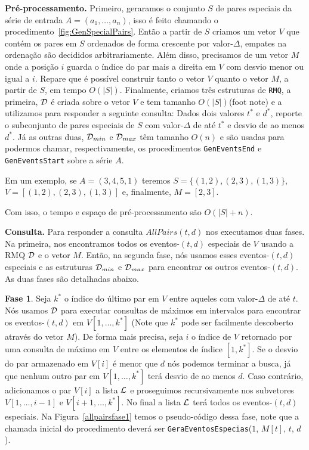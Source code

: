 \documentclass[12pt]{article}
\begin{document}
\textbf{Pré-processamento.} Primeiro, geraramos o conjunto $S$ de pares especiais da série de entrada $A = (a_1, \ldots, a_n)$,
isso é feito chamando o procedimento~\ref{fig:GenSpecialPairs}. Então a partir de $S$ criamos um vetor $V$ que
contém os pares em $S$ ordenados de forma crescente por valor-$\Delta$, empates na ordenação são decididos arbitrariamente. 
Além disso, precisamos de um vetor $M$ onde a posição $i$ guarda o índice do par mais a direita em $V$  com desvio menor ou igual a $i$.
Repare que é possível construir tanto o vetor $V$ quanto o vetor $M$, a partir de $S$, em tempo $O(|S|)$.
Finalmente, criamos três estruturas de {\tt RMQ}, a primeira, ${\cal D}$ é criada sobre o vetor $V$ e tem tamanho 
$O(|S|)$(foot note) e a utilizamos para responder a seguinte consulta: Dados dois valores $t^*$ e $d^*$, 
reporte o subconjunto de pares especiais de $S$ com valor-$\Delta$ de até $t^*$ e desvio de ao menos $d^*$. 
Já as outras duas, ${\cal D}_{min}$ e ${\cal D}_{max}$ têm tamanho $O(n)$ e são usadas para podermos chamar, 
respectivamente, os procedimentos {\tt GenEventsEnd} e {\tt GenEventsStart} sobre a série $A$. 

Em um exemplo, se $A = (3, 4, 5, 1)$ teremos $S = \{(1, 2), (2, 3), (1, 3)\}$, $V = [(1, 2), (2, 3), (1, 3)]$ e, 
finalmente, $M = [2, 3]$. 

Com isso, o tempo e espaço de pré-processamento são $O(|S| + n)$.

\textbf{Consulta.} Para responder a consulta $AllPairs(t, d)$ nos executamos duas fases. Na primeira, 
nos encontramos todos os eventos-$(t,d)$ especiais de $V$ usando a RMQ ${\cal D}$ e o vetor $M$.
Então, na segunda fase, nós usamos esses eventos-$(t,d)$ especiais e as estruturas 
${\cal D}_{min}$ e ${\cal D}_{max}$ para encontrar os outros eventos-$(t,d)$. As duas fases
são detalhadas abaixo.

\textbf{Fase 1}. Seja $k^*$ o índice do último par em $V$ entre aqueles com valor-$\Delta$
de até $t$. Nós usamos ${\cal D}$ para executar consultas de máximos em intervalos para
encontrar os eventos-$(t,d)$ em $V[1, \ldots, k^*]$ (Note que $k^*$ pode ser facilmente
descoberto através do vetor $M$). De forma mais precisa, seja $i$ o índice
de $V$ retornado por uma consulta de máximo em $V$ entre os elementos de
índice $[1, k^*]$. Se o desvio do par armazenado em $V[i]$ é menor que $d$ nós podemos
terminar a busca, já que nenhum outro par em $V[1, \ldots, k^*]$ terá desvio de ao menos $d$.
Caso contrário, adicionamos o par $V[i]$ a lista ${\cal L}$ e proseguimos recursivamente 
nos subvetores $V[1, \ldots, i - 1]$ e $V[i + 1, \ldots, k^*]$. No final a lista ${\cal L}$ terá
todos os eventos-$(t,d)$ especiais. Na Figura~\ref{allpairsfase1} temos o pseudo-código dessa fase,
note que a chamada inicial do procedimento deverá ser {\tt GeraEventosEspecias}($1$, $M[t]$, $t$, $d$).
\end{document}
